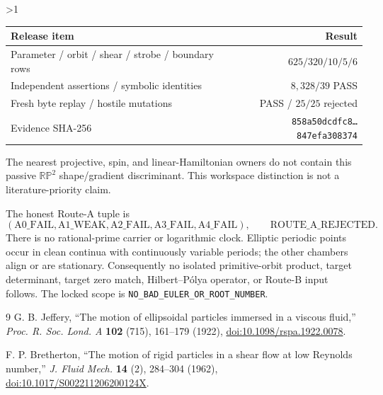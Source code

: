 \documentclass[10pt]{article}
\providecommand{\CRevisionRound}{2}
\newcommand{\RP}{\mathbb{RP}}
\begin{document}
\ifnum\CRevisionRound>1
\begin{center}
\small
\begin{tabular}{@{}lr@{}}
\toprule
Release item & Result\\
\midrule
Parameter / orbit / shear / strobe / boundary rows & $625/320/10/5/6$\\
Independent assertions / symbolic identities & $8{,}328/39$ PASS\\
Fresh byte replay / hostile mutations & PASS / $25/25$ rejected\\
Evidence SHA-256 & \texttt{858a50dcdfc8\ldots 847efa308374}\\
\bottomrule
\end{tabular}
\end{center}

The nearest projective, spin, and linear-Hamiltonian owners do not contain this
passive $\RP^2$ shape/gradient discriminant.  This workspace distinction is
not a literature-priority claim.
\fi

The honest Route-A tuple is
\[
 (\mathrm{A0\_FAIL},\mathrm{A1\_WEAK},\mathrm{A2\_FAIL},
  \mathrm{A3\_FAIL},\mathrm{A4\_FAIL}),
 \qquad \mathrm{ROUTE\_A\_REJECTED}. \tag{9}
\]
There is no rational-prime carrier or logarithmic clock.  Elliptic periodic
points occur in clean continua with continuously variable periods; the other
chambers align or are stationary.  Consequently no isolated primitive-orbit
product, target determinant, target zero match, Hilbert--P\'olya operator, or
Route-B input follows.  The locked scope is
\texttt{NO\_BAD\_EULER\_OR\_ROOT\_NUMBER}.

\begin{thebibliography}{9}
G. B. Jeffery, ``The motion of ellipsoidal particles immersed in a viscous
fluid,'' \emph{Proc. R. Soc. Lond. A} \textbf{102} (715), 161--179 (1922),
\href{https://doi.org/10.1098/rspa.1922.0078}{doi:10.1098/rspa.1922.0078}.

F. P. Bretherton, ``The motion of rigid particles in a shear flow at low
Reynolds number,'' \emph{J. Fluid Mech.} \textbf{14} (2), 284--304 (1962),
\href{https://doi.org/10.1017/S002211206200124X}{doi:10.1017/S002211206200124X}.
\end{thebibliography}
\end{document}
